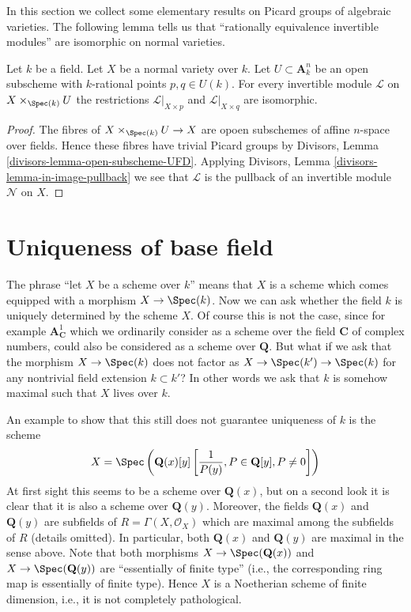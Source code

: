 \noindent
In this section we collect some elementary results on Picard groups
of algebraic varieties. The following lemma tells us that ``rationally
equivalence invertible modules'' are isomorphic on normal varieties.

\begin{lemma}
\label{lemma-rational-equivalence-for-Pic}
Let $k$ be a field. Let $X$ be a normal variety over $k$.
Let $U \subset \mathbf{A}^n_k$ be an open subscheme with
$k$-rational points $p, q \in U(k)$. For every invertible
module $\mathcal{L}$ on $X \times_{\Spec(k)} U$ the restrictions
$\mathcal{L}|_{X \times p}$ and $\mathcal{L}|_{X \times q}$
are isomorphic.
\end{lemma}

\begin{proof}
The fibres of $X \times_{\Spec(k)} U \to X$ are opoen subschemes
of affine $n$-space over fields. Hence these fibres have
trivial Picard groups by
Divisors, Lemma \ref{divisors-lemma-open-subscheme-UFD}.
Applying Divisors, Lemma \ref{divisors-lemma-in-image-pullback}
we see that $\mathcal{L}$ is the pullback of an invertible
module $\mathcal{N}$ on $X$.
\end{proof}










\section{Uniqueness of base field}
\label{section-base-field}

\noindent
The phrase ``let $X$ be a scheme over $k$'' means that $X$ is a scheme
which comes equipped with a morphism $X \to \Spec(k)$. Now we can
ask whether the field $k$ is uniquely determined by the scheme $X$.
Of course this is not the case, since for example
$\mathbf{A}^1_{\mathbf{C}}$ which we ordinarily consider as a scheme
over the field $\mathbf{C}$ of complex numbers, could also be considered
as a scheme over $\mathbf{Q}$. But what if we ask that the morphism
$X \to \Spec(k)$ does not factor as
$X \to \Spec(k') \to \Spec(k)$ for any nontrivial field
extension $k \subset k'$? In other words we ask that $k$ is
somehow maximal such that $X$ lives over $k$.

\medskip\noindent
An example to show that this still does not guarantee uniqueness of $k$
is the scheme
$$
X =
\Spec\left(
\mathbf{Q}(x)[y]\left[\frac{1}{P(y)}, P \in \mathbf{Q}[y], P \not = 0\right]
\right)
$$
At first sight this seems to be a scheme over $\mathbf{Q}(x)$, but on a
second look it is clear that it is also a scheme over $\mathbf{Q}(y)$.
Moreover, the fields $\mathbf{Q}(x)$ and $\mathbf{Q}(y)$ are subfields
of $R = \Gamma(X, \mathcal{O}_X)$ which are maximal among the subfields
of $R$ (details omitted). In particular, both $\mathbf{Q}(x)$ and
$\mathbf{Q}(y)$ are maximal in the sense above. Note that both morphisms
$X \to \Spec(\mathbf{Q}(x))$
and $X \to \Spec(\mathbf{Q}(y))$ are ``essentially of finite type''
(i.e., the corresponding ring map is essentially of finite type).
Hence $X$ is a Noetherian scheme of finite dimension, i.e., it is
not completely pathological.

